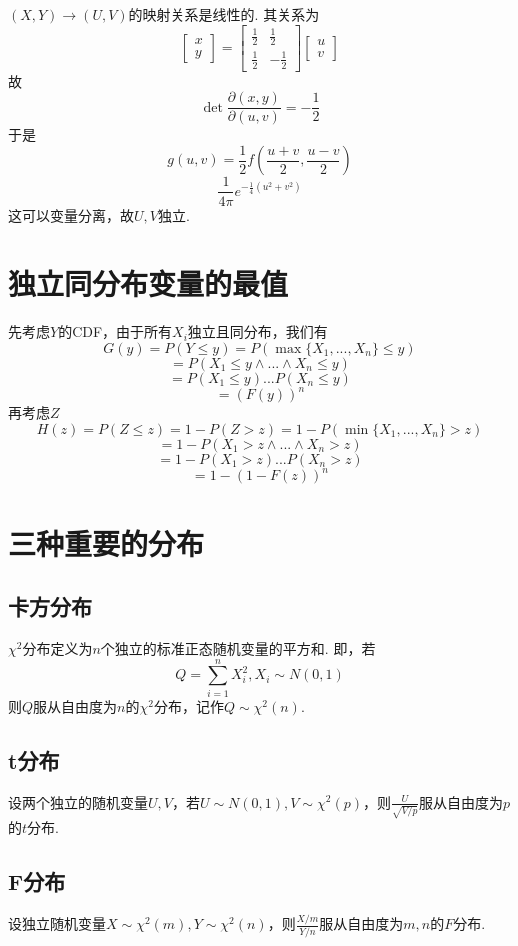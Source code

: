 \documentclass{article}
\begin{document}
\begin{CJK}{UTF8}{gbsn}
\subsection{}
$(X,Y)\to(U,V)$的映射关系是线性的. 其关系为
$$ \begin{bmatrix}x \\ y\end{bmatrix}
=\begin{bmatrix}\frac{1}{2} & \frac{1}{2}\\
    \frac{1}{2} & -\frac{1}{2}\end{bmatrix}
\begin{bmatrix}u \\ v\end{bmatrix}$$
故
$$ \det\frac{\partial(x,y)}{\partial(u,v)}=-\frac{1}{2}$$
于是
$$ g(u,v)=\frac{1}{2}f(\frac{u+v}{2},\frac{u-v}{2})$$
$$ \frac{1}{4\pi}e^{-\frac{1}{4}(u^{2}+v^{2})}$$
这可以变量分离，故$U,V$独立.
\section{独立同分布变量的最值}
先考虑$Y$的CDF，由于所有$X_{i}$独立且同分布，我们有
$$ G(y)=P(Y\leq y)=P(\max\{X_{1},...,X_{n}\}\leq y)$$
$$ =P(X_{1}\leq y\land ... \land X_{n}\leq y)$$
$$ =P(X_{1}\leq y)...P(X_{n}\leq y)$$
$$ =(F(y))^{n}$$
再考虑$Z$
$$ H(z)=P(Z\leq z)=1-P(Z>z)=1-P(\min\{X_{1},...,X_{n}\}>z)$$
$$ =1-P(X_{1}>z\land ...\land X_{n}>z)$$
$$ =1-P(X_{1}>z)...P(X_{n}>z)$$
$$ =1-(1-F(z))^{n}$$
\section{三种重要的分布}
\subsection{卡方分布}
$\chi^{2}$分布定义为$n$个独立的标准正态随机变量的平方和. 即，若
$$ Q=\sum\limits_{i=1}^{n}X_{i}^{2}, X_{i}\sim N(0,1)$$
则$Q$服从自由度为$n$的$\chi^{2}$分布，记作$Q\sim\chi^{2}(n)$.
\subsection{t分布}
设两个独立的随机变量$U,V$，若$U\sim N(0,1),V\sim\chi^{2}(p)$，则$\frac{U}{\sqrt{V/p}}$服从自由度为$p$的$t$分布.
\subsection{F分布}
设独立随机变量$X\sim\chi^{2}(m),Y\sim\chi^{2}(n)$，则$\frac{X/m}{Y/n}$服从自由度为$m,n$的$F$分布.

\end{CJK}
\end{document}
